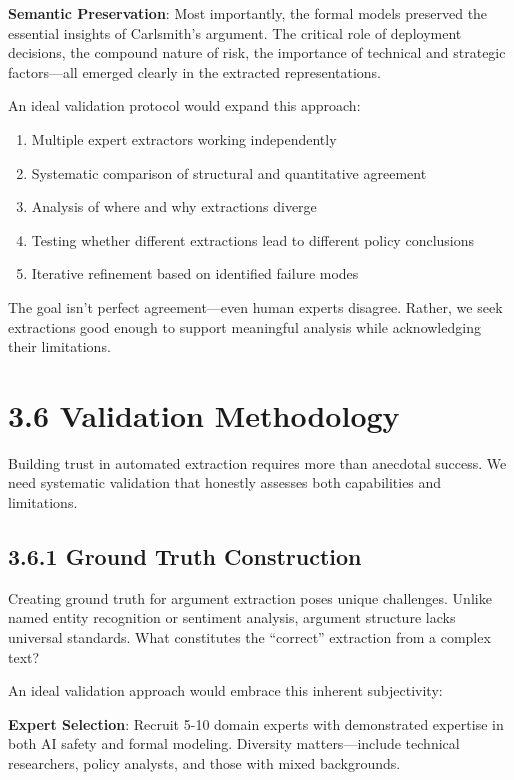 \documentclass[
  11pt,
  letterpaper,
  openany]{book}
\providecommand{\tightlist}{%
  \setlength{\itemsep}{0pt}\setlength{\parskip}{0pt}}
\begin{document}
\textbf{Semantic Preservation}: Most importantly, the formal models
preserved the essential insights of Carlsmith's argument. The critical
role of deployment decisions, the compound nature of risk, the
importance of technical and strategic factors---all emerged clearly in
the extracted representations.

An ideal validation protocol would expand this approach:

\begin{enumerate}
\def\labelenumi{\arabic{enumi}.}
\tightlist
\item
  Multiple expert extractors working independently
\item
  Systematic comparison of structural and quantitative agreement
\item
  Analysis of where and why extractions diverge
\item
  Testing whether different extractions lead to different policy
  conclusions
\item
  Iterative refinement based on identified failure modes
\end{enumerate}

The goal isn't perfect agreement---even human experts disagree. Rather,
we seek extractions good enough to support meaningful analysis while
acknowledging their limitations.

\section{3.6 Validation Methodology}\label{sec-validation-methodology}

Building trust in automated extraction requires more than anecdotal
success. We need systematic validation that honestly assesses both
capabilities and limitations.

\subsection{3.6.1 Ground Truth Construction}\label{sec-ground-truth}

Creating ground truth for argument extraction poses unique challenges.
Unlike named entity recognition or sentiment analysis, argument
structure lacks universal standards. What constitutes the ``correct''
extraction from a complex text?

An ideal validation approach would embrace this inherent subjectivity:

\textbf{Expert Selection}: Recruit 5-10 domain experts with demonstrated
expertise in both AI safety and formal modeling. Diversity
matters---include technical researchers, policy analysts, and those with
mixed backgrounds.
\end{document}
